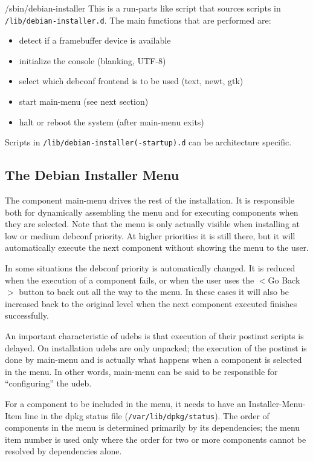 \documentclass[a4paper,10pt]{article}
\begin{document}
\begin{enumerate}
\begin{flushleft}
/sbin/debian-installer \linebreak
This is a run-parts like script that sources scripts in \texttt{/lib/debian-installer.d}. The main functions that are performed are:
  \end{flushleft}
  \begin{itemize}
\item detect if a framebuffer device is available
\item initialize the console (blanking, UTF-8)
\item select which debconf frontend is to be used (text, newt, gtk)
\item start main-menu (see next section)
\item halt or reboot the system (after main-menu exits)
  \end{itemize}
\end{enumerate}

Scripts in \texttt{/lib/debian-installer(-startup).d} can be architecture specific. 


\subsection{The Debian Installer Menu}
The component main-menu drives the rest of the installation. It is responsible both for dynamically assembling the menu and for executing components when they are selected. Note that the menu is only actually visible when installing at low or medium debconf priority. At higher priorities it is still there, but it will automatically execute the next component without showing the menu to the user. 

In some situations the debconf priority is automatically changed. It is reduced when the execution of a component fails, or when the user uses the $<$Go Back$>$ button to back out all the way to the menu. In these cases it will also be increased back to the original level when the next component executed finishes successfully. 

An important characteristic of udebs is that execution of their postinst scripts is delayed. On installation udebs are only unpacked; the execution of the postinst is done by main-menu and is actually what happens when a component is selected in the menu. In other words, main-menu can be said to be responsible for “configuring” the udeb. 

For a component to be included in the menu, it needs to have an Installer-Menu-Item line in the dpkg status file (\texttt{/var/lib/dpkg/status}). The order of components in the menu is determined primarily by its dependencies; the menu item number is used only where the order for two or more components cannot be resolved by dependencies alone. 
\end{document}
